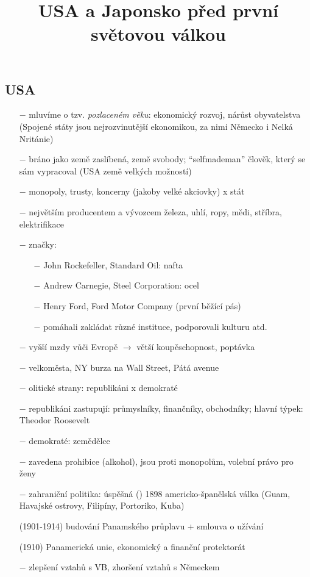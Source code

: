 \documentclass{article}
\title{\vspace{-2cm}USA a Japonsko před první světovou válkou\vspace{-1.7cm}}
\date{}
\author{}
\begin{document}
\maketitle

\subsection*{USA}
\begin{itemize}
    \vspace{-0.5em}
    \setlength\itemsep{0.15em}
    \item[$-$] mluvíme o tzv. \textit{pozlaceném věku}: ekonomický rozvoj, nárůst obyvatelstva (Spojené státy jsou nejrozvinutější ekonomikou, za nimi Německo i Nelká Nritánie)
    \item[$-$] bráno jako země zaslíbená, země svobody; “selfmademan” člověk, který se sám vypracoval (USA země velkých možností)
    \item[$-$] monopoly, trusty, koncerny (jakoby velké akciovky) x stát
    \item[$-$] největším producentem a vývozcem železa, uhlí, ropy, mědi, stříbra, elektrifikace
    \item[$-$] značky:  \begin{itemize}
        \vspace{-0.5em}
        \setlength\itemsep{0.15em}
        \item[$-$] John Rockefeller, Standard Oil: nafta
        \item[$-$] Andrew Carnegie, Steel Corporation: ocel
        \item[$-$] Henry Ford, Ford Motor Company (první běžící pás)
        \item[$-$] pomáhali zakládat různé instituce, podporovali kulturu atd.
    \end{itemize}
    \item[$-$] vyšší mzdy vůči Evropě $\rightarrow$ větší koupěschopnost, poptávka
    \item[$-$] velkoměsta, NY burza na Wall Street, Pátá avenue
    \item[$-$] olitické strany: republikáni x demokraté
    \item[$-$] republikáni zastupují: průmyslníky, finančníky, obchodníky; hlavní týpek: Theodor Roosevelt
    \item[$-$] demokraté: zemědělce
    \item[$-$] zavedena prohibice (alkohol), jsou proti monopolům, volební právo pro ženy
    \item[$-$] zahraniční politika: úspěšná () 1898 americko-španělská válka (Guam, Havajské ostrovy, Filipíny, Portoriko, Kuba)
    \item[(1901-1914)] budování Panamského průplavu  + smlouva o užívání
    \item[(1910)] Panamerická unie, ekonomický a finanční protektorát
    \item[$-$] zlepšení vztahů s VB, zhoršení vztahů s Německem

\end{itemize}
\end{document}
